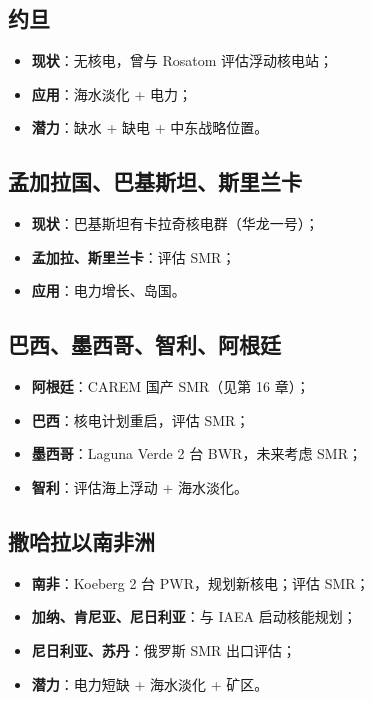 \documentclass[
  UTF8,
  scheme=plain,
  fontsize=10pt,
  openany
]{ctexbook}
\begin{document}
\subsection{约旦}\label{ux7ea6ux65e6}

\begin{itemize}
\tightlist
\item
  \textbf{现状}：无核电，曾与 Rosatom 评估浮动核电站；
\item
  \textbf{应用}：海水淡化 + 电力；
\item
  \textbf{潜力}：缺水 + 缺电 + 中东战略位置。
\end{itemize}

\subsection{孟加拉国、巴基斯坦、斯里兰卡}\label{ux5b5fux52a0ux62c9ux56fdux5df4ux57faux65afux5766ux65afux91ccux5170ux5361}

\begin{itemize}
\tightlist
\item
  \textbf{现状}：巴基斯坦有卡拉奇核电群（华龙一号）；
\item
  \textbf{孟加拉、斯里兰卡}：评估 SMR；
\item
  \textbf{应用}：电力增长、岛国。
\end{itemize}

\subsection{巴西、墨西哥、智利、阿根廷}\label{ux5df4ux897fux58a8ux897fux54e5ux667aux5229ux963fux6839ux5ef7}

\begin{itemize}
\tightlist
\item
  \textbf{阿根廷}：CAREM 国产 SMR（见第 16 章）；
\item
  \textbf{巴西}：核电计划重启，评估 SMR；
\item
  \textbf{墨西哥}：Laguna Verde 2 台 BWR，未来考虑 SMR；
\item
  \textbf{智利}：评估海上浮动 + 海水淡化。
\end{itemize}

\subsection{撒哈拉以南非洲}\label{ux6492ux54c8ux62c9ux4ee5ux5357ux975eux6d32}

\begin{itemize}
\tightlist
\item
  \textbf{南非}：Koeberg 2 台 PWR，规划新核电；评估 SMR；
\item
  \textbf{加纳、肯尼亚、尼日利亚}：与 IAEA 启动核能规划；
\item
  \textbf{尼日利亚、苏丹}：俄罗斯 SMR 出口评估；
\item
  \textbf{潜力}：电力短缺 + 海水淡化 + 矿区。
\end{itemize}
\end{document}
